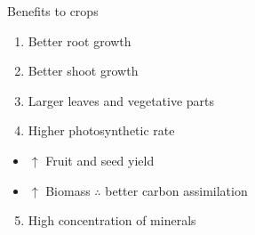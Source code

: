 \documentclass[11pt,dvipsnames,ignorenonframetext,aspectratio=169]{beamer}
\providecommand{\tightlist}{%
  \setlength{\itemsep}{0pt}\setlength{\parskip}{0pt}}
\begin{document}
\begin{frame}{}
\begin{center}
\end{center}
\end{frame}

\begin{frame}{Benefits to crops}
\protect\hypertarget{benefits-to-crops}{}
\begin{enumerate}
\tightlist
\item
  Better root growth
\item
  Better shoot growth
\item
  Larger leaves and vegetative parts
\item
  Higher photosynthetic rate
\end{enumerate}

\begin{itemize}
\tightlist
\item
  \(\uparrow\) Fruit and seed yield
\item
  \(\uparrow\) Biomass \(\therefore\) better carbon assimilation
\end{itemize}

\begin{enumerate}
\setcounter{enumi}{4}
\tightlist
\item
  High concentration of minerals
\end{enumerate}
\end{frame}
\end{document}
